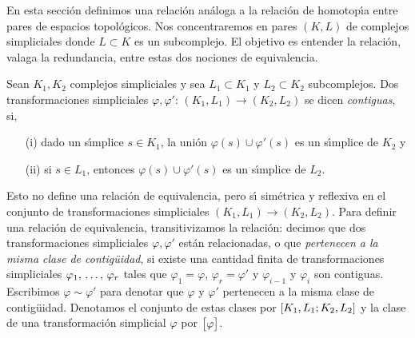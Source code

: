 \theoremstyle{plain}
\newtheorem{teoHomotopicasAdmitenAproximacionesContiguas}{Teorema}[section]
\newtheorem{lemaAproximacionesSonContiguas}%
	[teoHomotopicasAdmitenAproximacionesContiguas]{Lema}
\newtheorem{teoHomotopicasPorContiguas}%
	[teoHomotopicasAdmitenAproximacionesContiguas]{Teorema}
\newtheorem{coroCodominioNumerableHomotopicasNumerables}%
	[teoHomotopicasAdmitenAproximacionesContiguas]{Corolario}

\theoremstyle{remark}
\newtheorem{obsComposicionesDeContiguasSonContiguas}%
	[teoHomotopicasAdmitenAproximacionesContiguas]{Observaci\'{o}n}
\newtheorem{obsContiguasSonHomotopicas}%
	[teoHomotopicasAdmitenAproximacionesContiguas]{Observaci\'{o}n}
\newtheorem{obsLimiteDirectoDeSubdivisiones}%
	[teoHomotopicasAdmitenAproximacionesContiguas]{Observaci\'{o}n}


En esta secci\'{o}n definimos una relaci\'{o}n an\'{a}loga a la relaci\'{o}n
de homotop\'{\i}a entre pares de espacios topol\'{o}gicos. Nos concentraremos
en pares $(K,L)$ de complejos simpliciales donde $L\subset K$ es un
subcomplejo. El objetivo es entender la relaci\'{o}n, valaga la redundancia,
entre estas dos nociones de equivalencia.

Sean $K_{1},K_{2}$ complejos simpliciales y sea $L_{1}\subset K_{1}$ y
$L_{2}\subset K_{2}$ subcomplejos. Dos transformaciones simpliciales
$\varphi,\varphi':\,(K_{1},L_{1})\rightarrow (K_{2},L_{2})$ se dicen
\emph{contiguas}, si,
\begin{itemize}
	\item[(i)] dado un s\'{\i}mplice $s\in K_{1}$, la uni\'{o}n
		$\varphi(s)\cup\varphi'(s)$ es un s\'{\i}mplice de $K_{2}$ y
	\item[(ii)] si $s\in L_{1}$, entonces $\varphi(s)\cup\varphi'(s)$
		es un s\'{\i}mplice de $L_{2}$.
\end{itemize}
%
Esto no define una relaci\'{o}n de equivalencia, pero s\'{\i} sim\'{e}trica y
reflexiva en el conjunto de transformaciones simpliciales
$(K_{1},L_{1})\rightarrow (K_{2},L_{2})$. Para definir una relaci\'{o}n de
equivalencia, transitivizamos la relaci\'{o}n: decimos que dos transformaciones
simpliciales $\varphi,\varphi'$ est\'{a}n relacionadas, o que
\emph{pertenecen a la misma clase de contig\"{u}idad}, si existe una
cantidad finita de transformaciones simpliciales $\lista{\varphi}{r}$
tales que $\varphi_{1}=\varphi$, $\varphi_{r}=\varphi'$ y
$\varphi_{i-1}$ y $\varphi_{i}$ son contiguas. Escribimos
$\varphi\sim\varphi'$ para denotar que $\varphi$ y $\varphi'$ pertenecen a la
misma clase de contig\"{u}idad. Denotamos el conjunto de estas clases por
$\left[K_{1},L_{1};K_{2},L_{2}\right]$ y la clase de una transformaci\'{o}n
simplicial $\varphi$ por $\clase{\varphi}$.

